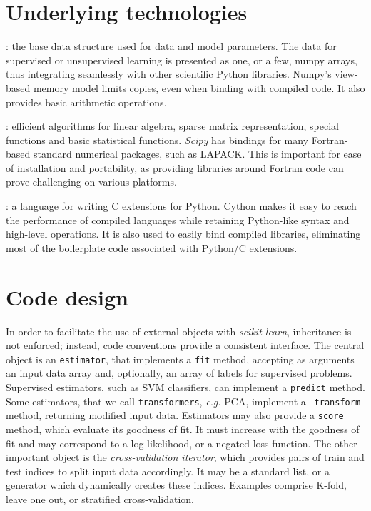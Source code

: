 \documentclass[twoside,11pt]{article}
\begin{document}
\section{Underlying technologies}

:
%
the base data structure used for data and model parameters.
The data for supervised or unsupervised learning is
presented as one, or a few, numpy arrays, thus integrating seamlessly
with other scientific Python libraries. Numpy's view-based memory
model limits copies, even when binding with compiled code. It also
provides basic arithmetic operations.

\smallskip
{}:
%
efficient algorithms for linear algebra, sparse matrix representation,
special functions and basic statistical functions. {\sl Scipy} has
bindings for many Fortran-based standard numerical packages, such as
LAPACK. This is important for ease of installation and portability, as
providing libraries around Fortran code can prove challenging on
various platforms.

\smallskip
{}:
%
a language for writing C extensions for Python. Cython makes it easy to
reach the performance of compiled languages while retaining
Python-like syntax and high-level operations. It is also used to
easily bind compiled libraries, eliminating most of the boilerplate code
associated with Python/C extensions.

\section{Code design}

%
In order to facilitate the use of external objects with \emph{scikit-learn},
inheritance is not enforced; instead, code
conventions provide a consistent interface.
The central object is an {\tt estimator}, that implements a
{\tt fit} method, accepting as arguments an input data array and,
optionally, an array of labels for supervised problems. Supervised estimators,
such as SVM classifiers, can implement a {\tt predict} method. Some estimators,
that we call {\tt transformers}, \emph{e.g.} PCA, implement a {\tt
transform} method, returning modified input data.
%
Estimators may also provide a {\tt score} method, which evaluate its
goodness of fit. It must increase with the goodness of fit and
may correspond to a log-likelihood, or a negated loss function.
%
The other important object is the \emph{cross-validation iterator},
which provides pairs of train and test indices to split input
data accordingly. It may be a standard list, or a generator
which dynamically
creates these indices.
Examples comprise K-fold,
leave one out, or
stratified cross-validation.
\end{document}
